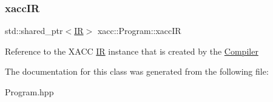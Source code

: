 \subsubsection{\texorpdfstring{xacc\+IR}{xaccIR}}
{\footnotesize\ttfamily std\+::shared\+\_\+ptr$<$\hyperlink{a02480}{IR}$>$ xacc\+::\+Program\+::xacc\+IR\hspace{0.3cm}{\ttfamily [protected]}}

Reference to the X\+A\+CC \hyperlink{a02480}{IR} instance that is created by the \hyperlink{a02448}{Compiler} 

The documentation for this class was generated from the following file\+:\begin{DoxyCompactItemize}
\item 
Program.\+hpp\end{DoxyCompactItemize}

